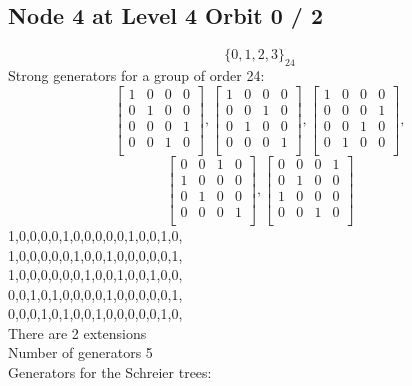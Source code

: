 \subsection*{Node 4 at Level 4 Orbit 0 / 2}
$$
\{ 0, 1, 2, 3 \}_{24}$$
{\small\arraycolsep=2pt
Strong generators for a group of order 24:
$$
\left[
\begin{array}{*{4}{r}}
1 & 0 & 0 & 0\\
0 & 1 & 0 & 0\\
0 & 0 & 0 & 1\\
0 & 0 & 1 & 0\\
\end{array}
\right]
, 
\left[
\begin{array}{*{4}{r}}
1 & 0 & 0 & 0\\
0 & 0 & 1 & 0\\
0 & 1 & 0 & 0\\
0 & 0 & 0 & 1\\
\end{array}
\right]
, 
\left[
\begin{array}{*{4}{r}}
1 & 0 & 0 & 0\\
0 & 0 & 0 & 1\\
0 & 0 & 1 & 0\\
0 & 1 & 0 & 0\\
\end{array}
\right]
, 
$$
$$
\left[
\begin{array}{*{4}{r}}
0 & 0 & 1 & 0\\
1 & 0 & 0 & 0\\
0 & 1 & 0 & 0\\
0 & 0 & 0 & 1\\
\end{array}
\right]
, 
\left[
\begin{array}{*{4}{r}}
0 & 0 & 0 & 1\\
0 & 1 & 0 & 0\\
1 & 0 & 0 & 0\\
0 & 0 & 1 & 0\\
\end{array}
\right]
$$
1,0,0,0,0,1,0,0,0,0,0,1,0,0,1,0,\\
1,0,0,0,0,0,1,0,0,1,0,0,0,0,0,1,\\
1,0,0,0,0,0,0,1,0,0,1,0,0,1,0,0,\\
0,0,1,0,1,0,0,0,0,1,0,0,0,0,0,1,\\
0,0,0,1,0,1,0,0,1,0,0,0,0,0,1,0,\\
}
There are 2 extensions\\
Number of generators 5\\
Generators for the Schreier trees:\\

